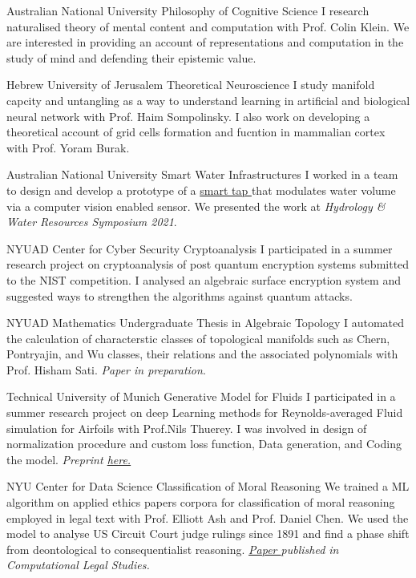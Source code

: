 {Australian National University}
{Philosophy of Cognitive Science}
{
	I research naturalised theory of mental content and computation with Prof. Colin Klein. We are interested in providing an account of representations and computation in the study of mind and defending their epistemic value.
}

{Hebrew University of Jerusalem}
{Theoretical Neuroscience}
{
	I study manifold capcity and untangling as a way to understand learning in artificial and biological neural network with Prof. Haim Sompolinsky. I also work on developing a theoretical account of grid cells formation and fucntion in mammalian cortex with Prof. Yoram Burak.  
}

{Australian National University}
{Smart Water Infrastructures}
{
	I worked in a team to design and develop a prototype of a 
	\href{http://tappyvision.herokuapp.com}{
		smart tap
	}that modulates water volume via a computer vision enabled sensor. We presented the work at \textit{Hydrology \& Water Resources Symposium 2021}.
}

{NYUAD Center for Cyber Security}
{Cryptoanalysis}
{
	I participated in a summer research project on cryptoanalysis of post quantum encryption systems submitted to the NIST competition. I analysed an algebraic surface encryption system and suggested ways to strengthen the algorithms against quantum attacks.
}

{NYUAD Mathematics}
{Undergraduate Thesis in Algebraic Topology}
{
	I automated the calculation of characterstic classes of topological manifolds such as Chern, Pontryajin, and Wu classes, their relations and the associated polynomials with Prof. Hisham Sati. \textit{Paper in preparation}.
}

{Technical University of Munich}
{Generative Model for Fluids}
{
	I participated in a summer research project on deep Learning methods for Reynolds-averaged Fluid simulation for Airfoils with Prof.Nils Thuerey. I was involved in design of normalization procedure and custom loss function, Data generation, and Coding the model. 
	\textit{ Preprint
		\href{https://www.researchgate.net/publication/328418525_Well_how_accurate_is_it_A_Study_of_Deep_Learning_Methods_for_Reynolds-Averaged_Navier-Stokes_Simulations}{
		here.
		}
	}
}

{NYU Center for Data Science}
{Classification of Moral Reasoning}
{
	We trained a ML algorithm on applied ethics papers corpora for classification of moral reasoning employed in legal text with Prof. Elliott Ash and Prof. Daniel Chen. We used the model to analyse US Circuit Court judge rulings since 1891 and find a phase shift from deontological to consequentialist reasoning.
	\textit{
		\href{https://papers.ssrn.com/sol3/papers.cfm?abstract_id=3205286}{
		Paper
		}published in Computational Legal Studies.}
}
